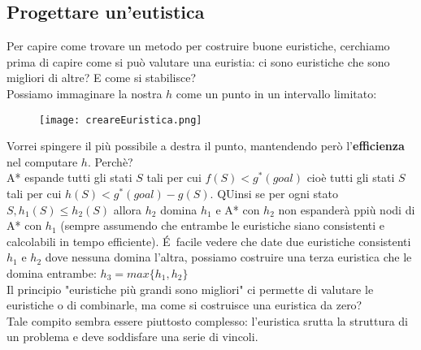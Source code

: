 \documentclass{article}
\begin{document}
\subsection{Progettare un'eutistica}
Per capire come trovare un metodo per costruire buone euristiche, cerchiamo prima di capire come si può valutare una euristia: ci sono euristiche che sono migliori di altre? E come si stabilisce?
\\ Possiamo immaginare la nostra $h$ come un punto in un intervallo limitato:
\begin{figure}[H]
    \centering
    \texttt{[image: creareEuristica.png]}
\end{figure}
Vorrei spingere il più possibile a destra il punto, mantendendo però l'\textbf{efficienza} nel computare $h$. Perchè?
\\ A* espande tutti gli stati $S$ tali per cui $f(S)<g^*(goal)$ cioè tutti gli stati $S$ tali per cui $h(S)<g^*(goal)-g(S)$. QUinsi se per ogni stato $S,h_1(S) \leq h_2(S)$ allora $h_2$ domina $h_1$ e A* con $h_2$ non espanderà ppiù nodi di A* con $h_1$ (sempre assumendo che entrambe le euristiche siano consistenti e calcolabili in tempo efficiente). \'E\ facile vedere che date due euristiche consistenti $h_1$ e $h_2$ dove nessuna domina l'altra, possiamo costruire una terza euristica che le domina entrambe: $h_3 = max\{h_1,h_2\}$
\\ Il principio "euristiche più grandi sono migliori" ci permette di valutare le euristiche o di combinarle, ma come si costruisce una euristica da zero?
\\ Tale compito sembra essere piuttosto complesso: l'euristica srutta la struttura di un problema e deve soddisfare una serie di vincoli. 
\end{document}
